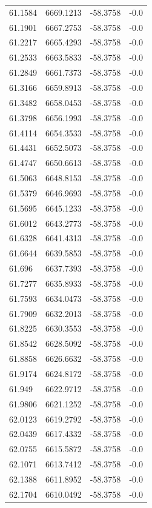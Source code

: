 \begin{table}[H]
\begin{tabular}{llll}
61.1584 & 6669.1213 & -58.3758 & -0.0 \\
61.1901 & 6667.2753 & -58.3758 & -0.0 \\
61.2217 & 6665.4293 & -58.3758 & -0.0 \\
61.2533 & 6663.5833 & -58.3758 & -0.0 \\
61.2849 & 6661.7373 & -58.3758 & -0.0 \\
61.3166 & 6659.8913 & -58.3758 & -0.0 \\
61.3482 & 6658.0453 & -58.3758 & -0.0 \\
61.3798 & 6656.1993 & -58.3758 & -0.0 \\
61.4114 & 6654.3533 & -58.3758 & -0.0 \\
61.4431 & 6652.5073 & -58.3758 & -0.0 \\
61.4747 & 6650.6613 & -58.3758 & -0.0 \\
61.5063 & 6648.8153 & -58.3758 & -0.0 \\
61.5379 & 6646.9693 & -58.3758 & -0.0 \\
61.5695 & 6645.1233 & -58.3758 & -0.0 \\
61.6012 & 6643.2773 & -58.3758 & -0.0 \\
61.6328 & 6641.4313 & -58.3758 & -0.0 \\
61.6644 & 6639.5853 & -58.3758 & -0.0 \\
61.696 & 6637.7393 & -58.3758 & -0.0 \\
61.7277 & 6635.8933 & -58.3758 & -0.0 \\
61.7593 & 6634.0473 & -58.3758 & -0.0 \\
61.7909 & 6632.2013 & -58.3758 & -0.0 \\
61.8225 & 6630.3553 & -58.3758 & -0.0 \\
61.8542 & 6628.5092 & -58.3758 & -0.0 \\
61.8858 & 6626.6632 & -58.3758 & -0.0 \\
61.9174 & 6624.8172 & -58.3758 & -0.0 \\
61.949 & 6622.9712 & -58.3758 & -0.0 \\
61.9806 & 6621.1252 & -58.3758 & -0.0 \\
62.0123 & 6619.2792 & -58.3758 & -0.0 \\
62.0439 & 6617.4332 & -58.3758 & -0.0 \\
62.0755 & 6615.5872 & -58.3758 & -0.0 \\
62.1071 & 6613.7412 & -58.3758 & -0.0 \\
62.1388 & 6611.8952 & -58.3758 & -0.0 \\
62.1704 & 6610.0492 & -58.3758 & -0.0 \\

\end{tabular}
\end{table}
